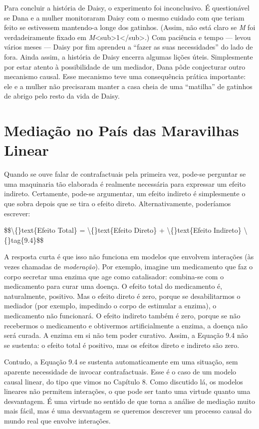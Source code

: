 \documentclass[11pt,a5paper,twoside]{book}
\begin{document}
Para concluir a história de Daisy, o experimento foi inconclusivo. É questionável se Dana e a mulher monitoraram Daisy com o mesmo cuidado com que teriam feito se estivessem mantendo-a longe dos gatinhos. (Assim, não está claro se \textit{M} foi verdadeiramente fixado em \textit{M}<sub>1</sub>.) Com paciência e tempo — levou vários meses — Daisy por fim aprendeu a “fazer as suas necessidades” do lado de fora. Ainda assim, a história de Daisy encerra algumas lições úteis. Simplesmente por estar atento à possibilidade de um mediador, Dana pôde conjecturar outro mecanismo causal. Esse mecanismo teve uma consequência prática importante: ele e a mulher não precisaram manter a casa cheia de uma “matilha” de gatinhos de abrigo pelo resto da vida de Daisy.

\section{Mediação no País das Maravilhas Linear}
Quando se ouve falar de contrafactuais pela primeira vez, pode-se perguntar se uma maquinaria tão elaborada é realmente necessária para expressar um efeito indireto. Certamente, pode-se argumentar, um efeito indireto é simplesmente o que sobra depois que se tira o efeito direto. Alternativamente, poderíamos escrever:

\$\$\textbackslash\{\}text\{Efeito Total\} = \textbackslash\{\}text\{Efeito Direto\} + \textbackslash\{\}text\{Efeito Indireto\} \textbackslash\{\}tag\{9.4\}\$\$

A resposta curta é que isso não funciona em modelos que envolvem interações (às vezes chamadas de \textit{moderação}). Por exemplo, imagine um medicamento que faz o corpo secretar uma enzima que age como catalisador: combina-se com o medicamento para curar uma doença. O efeito total do medicamento é, naturalmente, positivo. Mas o efeito direto é zero, porque se desabilitarmos o mediador (por exemplo, impedindo o corpo de estimular a enzima), o medicamento não funcionará. O efeito indireto também é zero, porque se não recebermos o medicamento e obtivermos artificialmente a enzima, a doença não será curada. A enzima em si não tem poder curativo. Assim, a Equação 9.4 não se sustenta: o efeito total é positivo, mas os efeitos direto e indireto são zero.

Contudo, a Equação 9.4 se sustenta automaticamente em uma situação, sem aparente necessidade de invocar contrafactuais. Esse é o caso de um modelo causal linear, do tipo que vimos no Capítulo 8. Como discutido lá, os modelos lineares não permitem interações, o que pode ser tanto uma virtude quanto uma desvantagem. É uma virtude no sentido de que torna a análise de mediação muito mais fácil, mas é uma desvantagem se queremos descrever um processo causal do mundo real que envolve interações.
\end{document}
